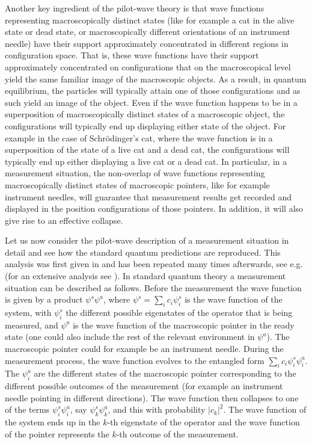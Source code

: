 \documentclass[12pt]{article}
\begin{document}
Another key ingredient of the pilot-wave theory is that wave functions representing macroscopically distinct states (like for example a cat in the alive state or dead state, or macroscopically different orientations of an instrument needle) have their support approximately concentrated in different regions in configuration space. That is, these wave functions have their support approximately concentrated on configurations that on the macroscopical level yield the same familiar image of the macroscopic objects. As a result, in quantum equilibrium, the particles will typically attain one of those configurations and as such yield an image of the object. Even if the wave function happens to be in a superposition of macroscopically distinct states of a macroscopic object, the configurations will typically end up displaying either state of the object. For example in the case of Schr\"odinger's cat, where the wave function is in a superposition of the state of a live cat and a dead cat, the configurations will typically end up either displaying a live cat or a dead cat. In particular, in a measurement situation, the non-overlap of wave functions representing macroscopically distinct states of macroscopic pointers, like for example instrument needles, will guarantee that measurement results get recorded and displayed in the position configurations of those pointers. In addition, it will also give rise to an effective collapse. 

Let us now consider the pilot-wave description of a measurement situation in detail and see how the standard quantum predictions are reproduced. This analysis was first given in \cite{bohm52b} and has been repeated many times afterwards, see e.g.\ \cite{bell87b,bohm87a} (for an extensive analysis see \cite{durr033}). In standard quantum theory a measurement situation can be described as follows. Before the measurement the wave function is given by a product $\psi^s \psi^a$, where $\psi^s=\sum_i c_i \psi^s_i$ is the wave function of the system, with $\psi^s_i$ the different possible eigenstates of the operator that is being measured, and $\psi^a$ is the wave function of the macroscopic pointer in the ready state (one could also include the rest of the relevant environment in $\psi^a$). The macroscopic pointer could for example be an instrument needle. During the measurement process, the wave function evolves to the entangled form $\sum_i c_i \psi^s_i \psi^a_i$. The $\psi^a_i$ are the different states of the macroscopic pointer corresponding to the different possible outcomes of the measurement (for example an instrument needle pointing in different directions). The wave function then collapses to one of the terms $\psi^s_i \psi^a_i$, say $\psi^s_k \psi^a_k$, and this with probability $|c_k |^2$. The wave function of the system ends up in the $k$-th eigenstate of the operator and the wave function of the pointer represents the $k$-th outcome of the measurement.
\end{document}
